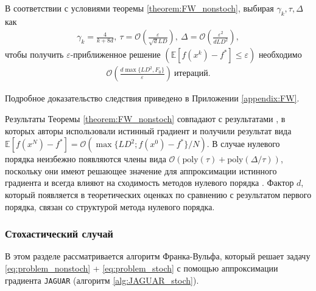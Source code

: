     \begin{corollary} \label{cor:FW_nonstoch}
    
        В соответствии с условиями теоремы \ref{theorem:FW_nonstoch}, выбирая $\gamma_k, \tau, \Delta$ как
        \begin{align*}
            \gamma_k = \frac{4}{k + 8d},\ \tau = \mathcal{O} \left( \frac{\varepsilon}{\sqrt{d} L D} \right),\ \Delta = \mathcal{O} \left( \frac{\varepsilon^2}{d L D^2} \right),
        \end{align*}
        чтобы получить $\varepsilon$-приближенное решение $(\mathbb{E} \left[f(x^k) - f^* \right] \leq \varepsilon)$ необходимо
        \begin{align*}
            \mathcal{O} \left( \frac{d \max \{ L D^2, F_0 \}}{\varepsilon} \right)\ \text{итераций}.
        \end{align*}

        \noindent Подробное доказательство следствия приведено в Приложении \ref{appendix:FW}.
        
    \end{corollary}

    Результаты Теоремы \ref{theorem:FW_nonstoch} совпадают с результатами \cite{frank1956algorithm, jaggi2013revisiting}, в которых авторы использовали истинный градиент и получили результат вида $\mathbb{E} \left[ f (x^N) - f^* \right] = \mathcal{O} \left( \max \{ LD^2; f(x^0) - f^* \} / N \right)$. В случае нулевого порядка неизбежно появляются члены вида $\mathcal{O} \left( \text{poly} (\tau) + \text{poly} (\Delta / \tau) \right)$, поскольку они имеют решающее значение для аппроксимации истинного градиента и всегда влияют на сходимость методов нулевого порядка \cite{risteski2016algorithms, sahu2018distributed, liu2018zeroth, beznosikov2020derivative}. Фактор $d$, который появляется в теоретических оценках по сравнению с результатом первого порядка, связан со структурой метода нулевого порядка.

\subsubsection{Стохастический случай} \label{section:JAGUAR_stoch}

    В этом разделе рассматривается алгоритм Франка-Вульфа, который решает задачу \eqref{eq:problem_nonstoch} + \eqref{eq:problem_stoch} с помощью аппроксимации градиента \texttt{JAGUAR} (алгоритм \ref{alg:JAGUAR_stoch}).

